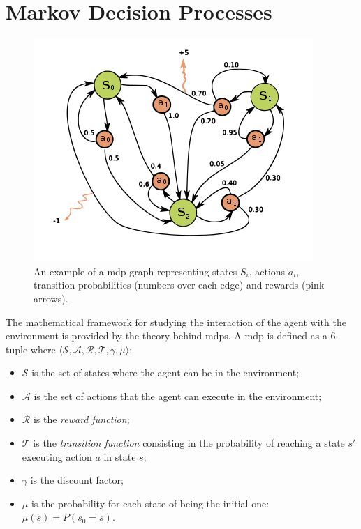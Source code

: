 \section{Markov Decision Processes}
\begin{figure}[t]
\begin{minipage}{\textwidth}
\begin{center}
  \includegraphics[scale=.6]{img/mdp2.png}
\end{center}
\end{minipage}
\caption[Example of a Markov Decision Process]{An example of a \gls{mdp} graph representing states $S_i$, actions $a_i$, transition probabilities (numbers over each edge) and rewards (pink arrows).}\label{F:mdp2}
\end{figure}
The mathematical framework for studying the interaction of the agent with the environment is provided by the theory behind \glspl{mdp}. A \gls{mdp} is defined as a $6$-tuple where $\langle \mathcal{S}, \mathcal{A}, \mathcal{R}, \mathcal{T}, \gamma, \mu \rangle$:
\begin{itemize}
 \item $\mathcal{S}$ is the set of states where the agent can be in the environment;
 \item $\mathcal{A}$ is the set of actions that the agent can execute in the environment;
 \item $\mathcal{R}$ is the \textit{reward function};
 \item $\mathcal{T}$ is the \textit{transition function} consisting in the probability of reaching a state $s'$ executing action $a$ in state $s$;
 \item $\gamma$ is the discount factor;
 \item $\mu$ is the probability for each state of being the initial one: $\mu(s) = P(s_0 = s)$.
\end{itemize}
